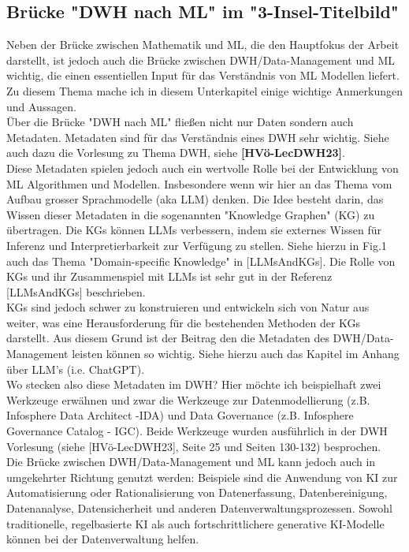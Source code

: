 \documentclass[12pt]{article}
\begin{document}
\subsection{Brücke "DWH nach ML" im "3-Insel-Titelbild"}
Neben der Brücke zwischen Mathematik und ML, die den Hauptfokus der Arbeit darstellt, ist jedoch auch die Brücke zwischen DWH/Data-Management und ML wichtig, die einen essentiellen Input für das Verständnis von ML Modellen liefert. Zu diesem Thema mache ich in diesem  Unterkapitel einige wichtige Anmerkungen und Aussagen.\\[0.1cm]
Über die Brücke "DWH nach ML" fließen nicht nur Daten sondern auch Metadaten. Metadaten sind für das Verständnis eines DWH sehr wichtig. Siehe auch dazu die Vorlesung zu Thema DWH, siehe \textbf{[HVö-LecDWH23]}.\\
Diese Metadaten spielen jedoch auch ein wertvolle Rolle bei der Entwicklung von ML Algorithmen und Modellen. Insbesondere wenn wir hier an das Thema vom Aufbau grosser Sprachmodelle (aka LLM) denken. Die Idee besteht darin, das Wissen dieser Metadaten in die sogenannten "Knowledge Graphen" (KG) zu übertragen. Die KGs können LLMs verbessern, indem sie externes Wissen für Inferenz und Interpretierbarkeit zur Verfügung zu stellen. Siehe hierzu in Fig.1 auch das Thema "Domain-specific Knowledge" in [LLMsAndKGs]. Die Rolle von KGs und ihr Zusammenspiel mit LLMs ist sehr gut in der Referenz [LLMsAndKGs] beschrieben.\\
KGs sind jedoch schwer zu konstruieren und entwickeln sich von Natur aus weiter, was eine Herausforderung für die bestehenden Methoden der KGs darstellt. Aus diesem Grund ist der Beitrag den die Metadaten des DWH/Data-Management leisten können so wichtig. Siehe hierzu auch das Kapitel im Anhang über LLM's (i.e. ChatGPT). \\ 
Wo stecken also diese Metadaten im DWH? Hier möchte ich beispielhaft zwei Werkzeuge erwähnen und zwar die Werkzeuge zur Datenmodellierung (z.B. Infosphere Data Architect -IDA) und Data Governance (z.B. Infosphere Governance Catalog - IGC). Beide Werkzeuge wurden ausführlich in der DWH Vorlesung (siehe [HVö-LecDWH23], Seite 25 und Seiten 130-132) besprochen. \\[0.1cm] 
%
Die Brücke zwischen DWH/Data-Management und ML kann jedoch auch in umgekehrter Richtung genutzt werden: Beispiele sind die Anwendung von KI zur Automatisierung oder Rationalisierung von Datenerfassung, Datenbereinigung, Datenanalyse, Datensicherheit und anderen Datenverwaltungsprozessen. Sowohl traditionelle, regelbasierte KI als auch fortschrittlichere generative KI-Modelle können bei der Datenverwaltung helfen.
\end{document}
